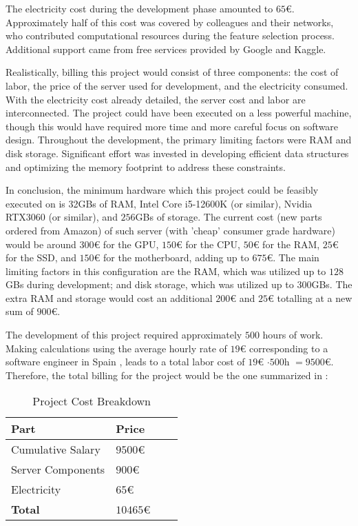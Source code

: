 The electricity cost during the development phase amounted to $65$€. Approximately half of this cost was covered by colleagues and their networks, who contributed computational resources during the feature selection process. Additional support came from free services provided by Google and Kaggle.\par
Realistically, billing this project would consist of three components: the cost of labor, the price of the server used for development, and the electricity consumed. With the electricity cost already detailed, the server cost and labor are interconnected. The project could have been executed on a less powerful machine, though this would have required more time and more careful focus on software design. Throughout the development, the primary limiting factors were RAM and disk storage. Significant effort was invested in developing efficient data structures and optimizing the memory footprint to address these constraints.\par
In conclusion, the minimum hardware which this project could be feasibly executed on is 32GBs of RAM, Intel Core i5-12600K (or similar), Nvidia RTX3060 (or similar), and $256$GBs of storage. The current cost (new parts ordered from Amazon) of such server (with 'cheap' consumer grade hardware) would be around $300$€ for the GPU, $150$€ for the CPU, $50$€ for the RAM, $25$€ for the SSD, and $150$€ for the motherboard, adding up to $675$€. The main limiting factors in this configuration are the RAM, which was utilized up to $128$GBs during development; and disk storage, which was utilized up to $300$GBs. The extra RAM and storage would cost an additional $200$€ and $25$€ totalling at a new sum of $900$€.\par
The development of this project required approximately $500$ hours of work. Making calculations using the average hourly rate of $19$€ corresponding to a software engineer in Spain \cite{salary}, leads to a total labor cost of $19$€ $ \cdot 500$h $ = 9500$€. Therefore, the total billing for the project would be the one summarized in :
\begin{table}[H]
\centering
\begin{tabular}{|l|l|l|l|}
\hline
\textbf{Part} & \textbf{Price} \\ \hline
Cumulative Salary & $9500$€ \\ \hline
Server Components & $900$€ \\ \hline
Electricity & $65$€ \\ \hline
\textbf{Total} & $10465$€ \\ \hline
\end{tabular}
\caption{Project Cost Breakdown}
\label{tab:sus2}
\end{table}

